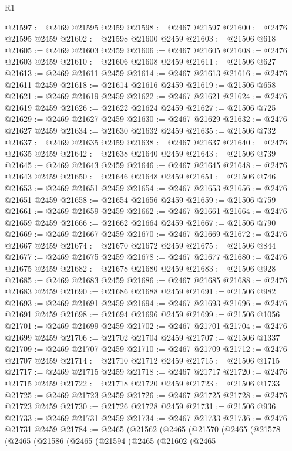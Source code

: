 \begin{lexlean}{R1}
\begin{coremodule}
@21597 := @2469 @21595 @2459
@21598 := @2467 @21597
@21600 := @2476 @21595 @2459
@21602 := @21598 @21600 @2459
@21603 := @21506 @618
@21605 := @2469 @21603 @2459
@21606 := @2467 @21605
@21608 := @2476 @21603 @2459
@21610 := @21606 @21608 @2459
@21611 := @21506 @627
@21613 := @2469 @21611 @2459
@21614 := @2467 @21613
@21616 := @2476 @21611 @2459
@21618 := @21614 @21616 @2459
@21619 := @21506 @658
@21621 := @2469 @21619 @2459
@21622 := @2467 @21621
@21624 := @2476 @21619 @2459
@21626 := @21622 @21624 @2459
@21627 := @21506 @725
@21629 := @2469 @21627 @2459
@21630 := @2467 @21629
@21632 := @2476 @21627 @2459
@21634 := @21630 @21632 @2459
@21635 := @21506 @732
@21637 := @2469 @21635 @2459
@21638 := @2467 @21637
@21640 := @2476 @21635 @2459
@21642 := @21638 @21640 @2459
@21643 := @21506 @739
@21645 := @2469 @21643 @2459
@21646 := @2467 @21645
@21648 := @2476 @21643 @2459
@21650 := @21646 @21648 @2459
@21651 := @21506 @746
@21653 := @2469 @21651 @2459
@21654 := @2467 @21653
@21656 := @2476 @21651 @2459
@21658 := @21654 @21656 @2459
@21659 := @21506 @759
@21661 := @2469 @21659 @2459
@21662 := @2467 @21661
@21664 := @2476 @21659 @2459
@21666 := @21662 @21664 @2459
@21667 := @21506 @790
@21669 := @2469 @21667 @2459
@21670 := @2467 @21669
@21672 := @2476 @21667 @2459
@21674 := @21670 @21672 @2459
@21675 := @21506 @844
@21677 := @2469 @21675 @2459
@21678 := @2467 @21677
@21680 := @2476 @21675 @2459
@21682 := @21678 @21680 @2459
@21683 := @21506 @928
@21685 := @2469 @21683 @2459
@21686 := @2467 @21685
@21688 := @2476 @21683 @2459
@21690 := @21686 @21688 @2459
@21691 := @21506 @982
@21693 := @2469 @21691 @2459
@21694 := @2467 @21693
@21696 := @2476 @21691 @2459
@21698 := @21694 @21696 @2459
@21699 := @21506 @1056
@21701 := @2469 @21699 @2459
@21702 := @2467 @21701
@21704 := @2476 @21699 @2459
@21706 := @21702 @21704 @2459
@21707 := @21506 @1337
@21709 := @2469 @21707 @2459
@21710 := @2467 @21709
@21712 := @2476 @21707 @2459
@21714 := @21710 @21712 @2459
@21715 := @21506 @1715
@21717 := @2469 @21715 @2459
@21718 := @2467 @21717
@21720 := @2476 @21715 @2459
@21722 := @21718 @21720 @2459
@21723 := @21506 @1733
@21725 := @2469 @21723 @2459
@21726 := @2467 @21725
@21728 := @2476 @21723 @2459
@21730 := @21726 @21728 @2459
@21731 := @21506 @936
@21733 := @2469 @21731 @2459
@21734 := @2467 @21733
@21736 := @2476 @21731 @2459
@21784 := @2465
    (@21562
      (@2465
        (@21570
          (@2465
            (@21578
              (@2465
                (@21586
                  (@2465
                    (@21594
                      (@2465
                        (@21602
                          (@2465

\end{coremodule}
\end{lexlean}
